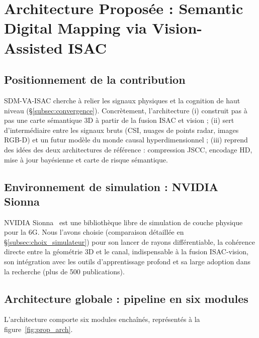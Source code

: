 \documentclass[12pt,a4paper,titlepage]{article}
\begin{document}
\section{Architecture Proposée : Semantic Digital Mapping via Vision-Assisted ISAC}
\label{sec:architecture_proposee}

\subsection{Positionnement de la contribution}

SDM-VA-ISAC cherche à relier les signaux physiques et la cognition de haut niveau (\S\ref{subsec:convergence}). Concrètement, l'architecture (i) construit pas à pas une carte sémantique 3D à partir de la fusion ISAC et vision ; (ii) sert d'intermédiaire entre les signaux bruts (CSI, nuages de points radar, images RGB-D) et un futur modèle du monde causal hyperdimensionnel ; (iii) reprend des idées des deux architectures de référence : compression JSCC, encodage HD, mise à jour bayésienne et carte de risque sémantique.

\subsection{Environnement de simulation : NVIDIA Sionna}

NVIDIA Sionna~\cite{sionna,sionna_rt_2} est une bibliothèque libre de simulation de couche physique pour la 6G. Nous l'avons choisie (comparaison détaillée en \S\ref{subsec:choix_simulateur}) pour son lancer de rayons différentiable, la cohérence directe entre la géométrie 3D et le canal, indispensable à la fusion ISAC-vision, son intégration avec les outils d'apprentissage profond et sa large adoption dans la recherche (plus de 500 publications).

\subsection{Architecture globale : pipeline en six modules}
\label{subsec:pipeline_six_modules}

L'architecture comporte six modules enchaînés, représentés à la figure~\ref{fig:prop_arch}.
\end{document}
